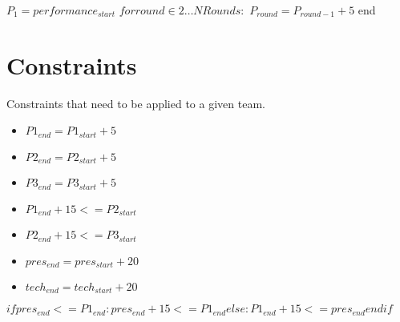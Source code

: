 \documentclass[letterpaper,11pt]{report}
\begin{document}
$P_{1} = performance_{start}$
$for round \in 2 \dots NRounds:$
\begin{math}
  P_{round} = P_{round-1} + 5
\end{math}
end

\section{Constraints}
Constraints that need to be applied to a given team.

\begin{itemize}
\item $P1_{end} = P1_{start} + 5$
\item $P2_{end} = P2_{start} + 5$
\item $P3_{end} = P3_{start} + 5$

\item $P1_{end} + 15 <= P2_{start}$
\item $P2_{end} + 15 <= P3_{start}$

\item $pres_{end} = pres_{start} + 20$
\item $tech_{end} = tech_{start} + 20$

\end{itemize}

\begin{math}
if pres_{end} <= P1_{end}:
  pres_{end} + 15 <= P1_{end}
else:
  P1_{end} + 15 <= pres_{end}
endif
\end{math}




\end{document}
